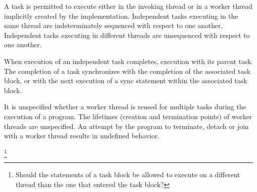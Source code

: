 
\pnum
A task is permitted to execute
either in the invoking thread
or in a worker thread implicitly created by the implementation.
Independent tasks executing in the same thread
are indeterminately sequenced with respect to one another.
Independent tasks executing in different threads
are unsequenced with respect to one another.

\pnum
When execution of an independent task completes,
execution
with its parent task.
The completion of a task synchronizes
with the completion of the associated task block,
or with the next execution of a sync statement
within the associated task block.

\pnum
It is unspecified whether a worker thread is reused
for multiple tasks
during the execution of a program.
The lifetimes (creation and termination points)
of worker threads are unspecified.
An attempt by the program
to terminate, detach or join with 
a worker thread
results in undefined behavior.

\pnum
{}%
\footnote{%
Should the statements of a task block be allowed to execute
on a different thread than the one that entered the task block?
}

\begin{note}
\end{note}	

